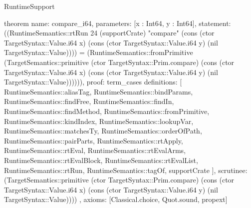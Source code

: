 \begin{lexlean}{RuntimeSupport}
\begin{semanticmodule}
theorem{
  name: compare_i64,
  parameters: [x : Int64, y : Int64],
  statement: ((RuntimeSemantics::rtRun 24 (supportCrate) "compare" (cons (ctor TargetSyntax::Value.i64 x) (cons (ctor TargetSyntax::Value.i64 y) (nil TargetSyntax::Value)))) = (RuntimeSemantics::fromPrimitive (TargetSemantics::primitive (ctor TargetSyntax::Prim.compare) (cons (ctor TargetSyntax::Value.i64 x) (cons (ctor TargetSyntax::Value.i64 y) (nil TargetSyntax::Value)))))),
  proof: term_cases{
    definitions: [
      RuntimeSemantics::aliasTag,
      RuntimeSemantics::bindParams,
      RuntimeSemantics::findFree,
      RuntimeSemantics::findIn,
      RuntimeSemantics::findMethod,
      RuntimeSemantics::fromPrimitive,
      RuntimeSemantics::kindIndex,
      RuntimeSemantics::lookupVar,
      RuntimeSemantics::matchesTy,
      RuntimeSemantics::orderOfPath,
      RuntimeSemantics::pairParts,
      RuntimeSemantics::rtApply,
      RuntimeSemantics::rtEval,
      RuntimeSemantics::rtEvalArms,
      RuntimeSemantics::rtEvalBlock,
      RuntimeSemantics::rtEvalList,
      RuntimeSemantics::rtRun,
      RuntimeSemantics::tagOf,
      supportCrate
    ],
    scrutinee: (TargetSemantics::primitive (ctor TargetSyntax::Prim.compare) (cons (ctor TargetSyntax::Value.i64 x) (cons (ctor TargetSyntax::Value.i64 y) (nil TargetSyntax::Value))))
  },
  axioms: [Classical.choice, Quot.sound, propext]
}
\end{semanticmodule}
\end{lexlean}
